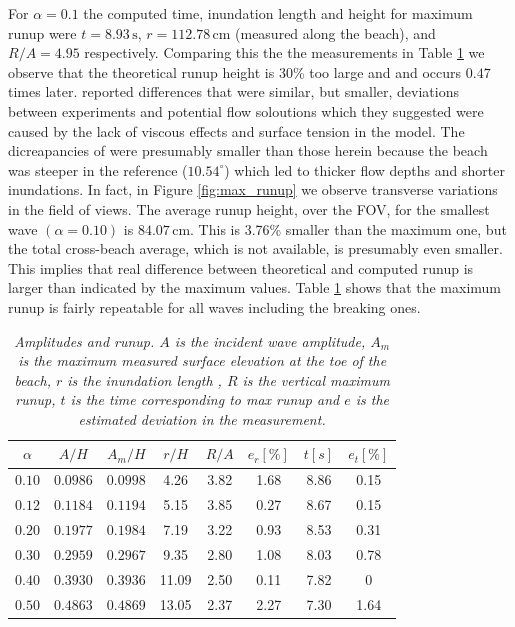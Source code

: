 \documentclass[review, authoryear]{elsarticle}
\newcommand{\s}{\,\mbox{s}}
\newcommand{\cm}{\,\mbox{cm}}
\begin{document}
For $\alpha=0.1$ the computed time, inundation length and height for  
maximum runup  
were $t=8.93\s$, $r=112.78\cm$ (measured along the beach), and $R/A=4.95$ 
respectively. 
Comparing this the the measurements in Table \ref{tab:max_shore} we observe that the theoretical runup height is  30\%  too large and and occurs $0.47$ times later.   \cite{pedersen2013runup} reported differences that were similar, but smaller, deviations
between experiments and potential flow soloutions which they suggested were caused by the lack of viscous effects and surface tension in the model. The dicreapancies of  \cite{pedersen2013runup} were presumably smaller than those herein because the 
beach was steeper in the reference ($10.54 ^\circ$) which led to thicker flow depths and shorter inundations. 
In fact, in Figure \ref{fig:max_runup} we observe transverse variations in the field of views. The average runup height, over the FOV, for the smallest wave $(\alpha=0.10)$ is $84.07\cm$. This  is  3.76\% smaller than the maximum one, but the 
total cross-beach average, which is not available, is presumably even smaller. This implies that real difference between theoretical and computed runup is larger than indicated by the maximum values. Table \ref{tab:max_shore} shows that the maximum runup is fairly repeatable for all waves including the breaking ones. %

\begin{table}[]
\caption{\textit{Amplitudes and runup. $A$ is  the incident wave amplitude, $A_m$ is the maximum measured surface elevation at the toe of the beach, $r$ is the inundation length , $R$ is the vertical maximum runup, $t$ is the time corresponding to max runup and $e$ is the estimated deviation in the measurement.}}
\centering
\begin{tabular}{cccccccc}
\hline
      $\alpha$&  $A/H$&   $A_m/H$&  $r/H$ &$R/A$ & $e_r [\%]$ & $t [s]$ & $e_t [\%]$ \\ \hline
\textit{$0.10$} &\textit{$0.0986$}  &\textit{$0.0998$}  & 4.26    &    3.82  & 1.68             & 8.86  & 0.15              \\
\textit{$0.12$}  &\textit{$0.1184$}  &\textit{$0.1194$}  & 5.15   &    3.85   & 0.27             & 8.67       & 0.15               \\
\textit{$0.20$}  &\textit{$0.1977$}  &\textit{$0.1984$} & 7.19    &    3.22  & 0.93            & 8.53       & 0.31                \\
\textit{$0.30$}  &\textit{$0.2959$}  &\textit{$0.2967$}  & 9.35     &   2.80  & 1.08           & 8.03      & 0.78              \\
\textit{$0.40$}  &\textit{$0.3930$}  &\textit{$0.3936$}  & 11.09      &   2.50 & 0.11            & 7.82 & 0              \\
\textit{$0.50$}  &\textit{$0.4863$}  &\textit{$0.4869$}  & 13.05       &    2.37 & 2.27            & 7.30  & 1.64              
\end{tabular}
\label{tab:max_shore}
\end{table}
\end{document}
